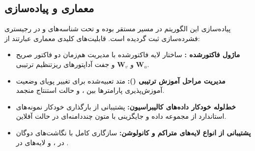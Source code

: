 \subsection{معماری و پیاده‌سازی}
پیاده‌سازی این الگوریتم در مسیر  مستقر بوده و تحت شناسه‌های  و  در رجیستری فشرده‌سازی ثبت گردیده است. قابلیت‌های کلیدی معماری عبارتند از:
\begin{itemize}
    \item \textbf{ماژول فاکتورشده :} ساختار لایه فاکتورشده با مدیریت هم‌زمان دو فاکتور صریح $\mathbf{W}_u$ و $\mathbf{W}_v$ و جفت آداپتورهای ریزتنظیم ترتیبی.
    \item \textbf{مدیریت مراحل آموزش ترتیبی ():} متد تعبیه‌شده برای تغییر پویای وضعیت آموزش‌پذیری پارامترها بین ،  و حالت استنتاج منجمد.
    \item \textbf{خط‌لوله خودکار داده‌های کالیبراسیون:} پشتیبانی از بارگذاری خودکار نمونه‌های استاندارد از مجموعه داده  و جایگزینی با متون چنددامنه‌ای در حالت آفلاین.
    \item \textbf{پشتیبانی از انواع لایه‌های متراکم و کانولوشن:} سازگاری کامل با نگاشت‌های دوگان در ،  و لایه‌های  در .
\end{itemize}
